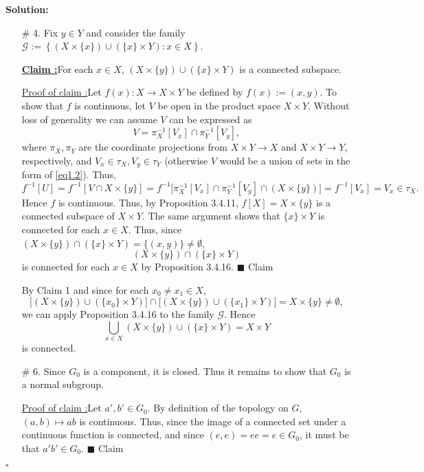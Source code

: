 \documentclass[12pt]{article}
\newcounter{ProofCounter}
\newcounter{ClaimCounter}[ProofCounter]
\newenvironment{Solution}{\stepcounter{ProofCounter}\textbf{Solution:}}{\hfill$\square$}
\newenvironment{claim}[1]{\vspace{1mm}\stepcounter{ClaimCounter}\par\noindent\underline{\bf Claim \theClaimCounter:}\space#1}{}
\newenvironment{claimproof}[1]{\par\noindent\underline{Proof of claim \theClaimCounter:}\space#1}{\hfill $\blacksquare$ Claim \theClaimCounter}
\begin{document}
\begin{Solution}
\begin{enumerate}
    \item[\# 4.] Fix $y \in Y$ and consider the family $\mathcal{G} := \left\{ (X \times \{x\}) \cup (\{x\} \times Y) : x \in X \right\}$.

      \begin{claim}
        For each $x \in X$, $(X \times \{y\}) \cup (\{x\} \times Y)$ is a connected subspace.
      \end{claim}
      \begin{claimproof}
        Let $f(x) : X \rightarrow X \times Y$ be defined by $f(x) := (x,y)$. To show that $f$ is continuous, let $V$ be open in
        the product space $X \times Y$. Without loss of generality we can assume $V$ can be expressed as
        \begin{equation}
          V = \pi_{X}^{-1}[V_x] \cap \pi_{Y}^{-1}[V_y], 
          \label{eq1.2}
        \end{equation}
        where $\pi_{X}, \pi_{Y}$ are the coordinate projections from $X\times Y \rightarrow X$ and $X\times
        Y \rightarrow Y$, respectively, and $V_x \in \tau_{X}, V_y \in \tau_{Y}$ (otherwise $V$ would be a union of sets in the form of \eqref{eq1.2}). Thus,
        \[
          f^{-1}[U] = f^{-1}[V \cap X \times \{y\}] = f^{-1}\big[\pi_{X}^{-1}[V_x] \cap \pi_{Y}^{-1}[V_y] \cap (X \times \{y\})\big] = f^{-1}[V_x] = V_x
          \in \tau_X.
        \]
        Hence $f$ is continuous. Thus, by Proposition 3.4.11, $f[X] = X\times \{y\}$ is a connected subspace of $X \times Y$. The same argument shows
        that $\{x\} \times Y$ is connected for each $x \in X$. Thus, since $(X \times \{y\}) \cap (\{x\} \times Y) = \{(x,y)\} \neq \emptyset$, 
        \[
          (X \times \{y\}) \cap (\{x\} \times Y)
        \]
        is connected for each $x \in X$ by Proposition 3.4.16.
      \end{claimproof}

      By Claim 1 and since for each $x_0 \neq x_1 \in X$, 
      \[
        \big[(X \times \{y\}) \cup (\{x_0\} \times Y)\big] \cap \big[(X \times \{y\}) \cup (\{x_1\} \times Y)\big] = X \times \{y\} \neq \emptyset,
      \]
      we can apply Proposition 3.4.16 to the family $\mathcal{G}$. Hence 
      \[
        \bigcup_{x \in X} (X \times \{y\}) \cup (\{x\} \times Y) = X \times Y
      \]
      is connected.

    \item[\# 6.] Since $G_0$ is a component, it is closed. Thus it remains to show that $G_0$ is a normal subgroup.

      \begin{claimproof}
        Let $a', b' \in G_0$. By definition of the topology on $G$, $(a,b) \mapsto ab$ is continuous. Thus, since the image of a connected set under a continuous function
        is connected, and since $(e,e) = ee = e \in G_0$, it must be that $a'b' \in G_0$.
      \end{claimproof}


\end{enumerate}
\end{Solution}
\end{document}
